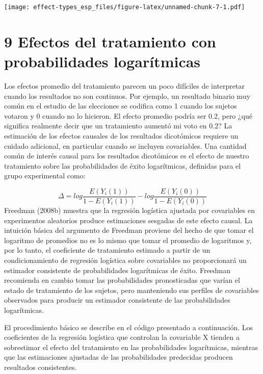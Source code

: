 \documentclass[
]{article}
\begin{document}
\texttt{[image: effect-types\_esp\_files/figure-latex/unnamed-chunk-7-1.pdf]}

\hypertarget{efectos-del-tratamiento-con-probabilidades-logaruxedtmicas}{%
\section{9 Efectos del tratamiento con probabilidades
logarítmicas}\label{efectos-del-tratamiento-con-probabilidades-logaruxedtmicas}}

Los efectos promedio del tratamiento parecen un poco difíciles de
interpretar cuando los resultados no son continuos. Por ejemplo, un
resultado binario muy común en el estudio de las elecciones se codifica
como 1 cuando los sujetos votaron y 0 cuando no lo hicieron. El efecto
promedio podría ser 0.2, pero ¿qué significa realmente decir que un
tratamiento aumentó mi voto en 0.2? La estimación de los efectos
causales de los resultados dicotómicos requiere un cuidado adicional, en
particular cuando se incluyen covariables. Una cantidad común de interés
causal para los resultados dicotómicos es el efecto de nuestro
tratamiento sobre las probabilidades de éxito logarítmicas, definidas
para el grupo experimental como:

\[\Delta = log\frac{E(Y_i(1))}{1-E(Y_i(1))} - log\frac{E(Y_i(0))}{1-E(Y_i(0))}\]
Freedman (2008b) muestra que la regresión logística ajustada por
covariables en experimentos aleatorios produce estimaciones sesgadas de
este efecto causal. La intuición básica del argumento de Freedman
proviene del hecho de que tomar el logaritmo de promedios no es lo mismo
que tomar el promedio de logaritmos y, por lo tanto, el coeficiente de
tratamiento estimado a partir de un condicionamiento de regresión
logística sobre covariables no proporcionará un estimador consistente de
probabilidades logarítmicas de éxito. Freedman recomienda en cambio
tomar las probabilidades pronosticadas que varían el estado de
tratamiento de los sujetos, pero manteniendo sus perfiles de covariables
observados para producir un estimador consistente de las probabilidades
logarítmicas.

El procedimiento básico se describe en el código presentado a
continuación. Los coeficientes de la regresión logística que controlan
la covariable X tienden a sobrestimar el efecto del tratamiento en las
probabilidades logarítmicas, mientras que las estimaciones ajustadas de
las probabilidades predecidas producen resultados consistentes.
\end{document}

